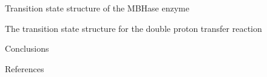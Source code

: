 \documentclass[final]{beamer}
\newlength{\sepwidth}
\newlength{\colwidth}
\newcommand{\separatorcolumn}{\begin{column}{\sepwidth}\end{column}}
\begin{document}
\begin{frame}[t]
\begin{columns}[t]
\begin{column}{\colwidth}
  

  \begin{block}{Transition state structure of the MBHase enzyme}

    The transition state structure for the double proton transfer reaction 


    

  \end{block}
\begin{block}{Conclusions}

    

    


    

  \end{block}
  \begin{block}{References}

    \nocite{*}
    \footnotesize{}

  \end{block}

\end{column}

\separatorcolumn
\end{columns}
\end{frame}
\end{document}
